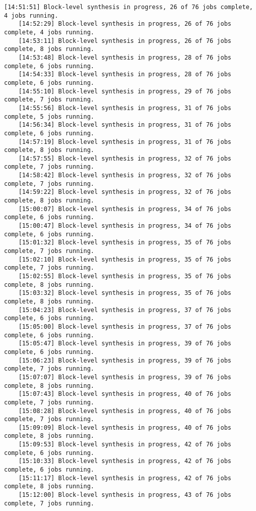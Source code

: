 \begin{lstlisting}[caption=Содержимое файла v++\_vinc.log, label={log1}]
	[14:51:51] Block-level synthesis in progress, 26 of 76 jobs complete, 4 jobs running.
	[14:52:29] Block-level synthesis in progress, 26 of 76 jobs complete, 4 jobs running.
	[14:53:11] Block-level synthesis in progress, 26 of 76 jobs complete, 8 jobs running.
	[14:53:48] Block-level synthesis in progress, 28 of 76 jobs complete, 6 jobs running.
	[14:54:33] Block-level synthesis in progress, 28 of 76 jobs complete, 6 jobs running.
	[14:55:10] Block-level synthesis in progress, 29 of 76 jobs complete, 7 jobs running.
	[14:55:56] Block-level synthesis in progress, 31 of 76 jobs complete, 5 jobs running.
	[14:56:34] Block-level synthesis in progress, 31 of 76 jobs complete, 6 jobs running.
	[14:57:19] Block-level synthesis in progress, 31 of 76 jobs complete, 8 jobs running.
	[14:57:55] Block-level synthesis in progress, 32 of 76 jobs complete, 7 jobs running.
	[14:58:42] Block-level synthesis in progress, 32 of 76 jobs complete, 7 jobs running.
	[14:59:22] Block-level synthesis in progress, 32 of 76 jobs complete, 8 jobs running.
	[15:00:07] Block-level synthesis in progress, 34 of 76 jobs complete, 6 jobs running.
	[15:00:47] Block-level synthesis in progress, 34 of 76 jobs complete, 6 jobs running.
	[15:01:32] Block-level synthesis in progress, 35 of 76 jobs complete, 7 jobs running.
	[15:02:10] Block-level synthesis in progress, 35 of 76 jobs complete, 7 jobs running.
	[15:02:55] Block-level synthesis in progress, 35 of 76 jobs complete, 8 jobs running.
	[15:03:32] Block-level synthesis in progress, 35 of 76 jobs complete, 8 jobs running.
	[15:04:23] Block-level synthesis in progress, 37 of 76 jobs complete, 6 jobs running.
	[15:05:00] Block-level synthesis in progress, 37 of 76 jobs complete, 6 jobs running.
	[15:05:47] Block-level synthesis in progress, 39 of 76 jobs complete, 6 jobs running.
	[15:06:23] Block-level synthesis in progress, 39 of 76 jobs complete, 7 jobs running.
	[15:07:07] Block-level synthesis in progress, 39 of 76 jobs complete, 8 jobs running.
	[15:07:43] Block-level synthesis in progress, 40 of 76 jobs complete, 7 jobs running.
	[15:08:28] Block-level synthesis in progress, 40 of 76 jobs complete, 7 jobs running.
	[15:09:09] Block-level synthesis in progress, 40 of 76 jobs complete, 8 jobs running.
	[15:09:53] Block-level synthesis in progress, 42 of 76 jobs complete, 6 jobs running.
	[15:10:33] Block-level synthesis in progress, 42 of 76 jobs complete, 6 jobs running.
	[15:11:17] Block-level synthesis in progress, 42 of 76 jobs complete, 8 jobs running.
	[15:12:00] Block-level synthesis in progress, 43 of 76 jobs complete, 7 jobs running.

\end{lstlisting}
